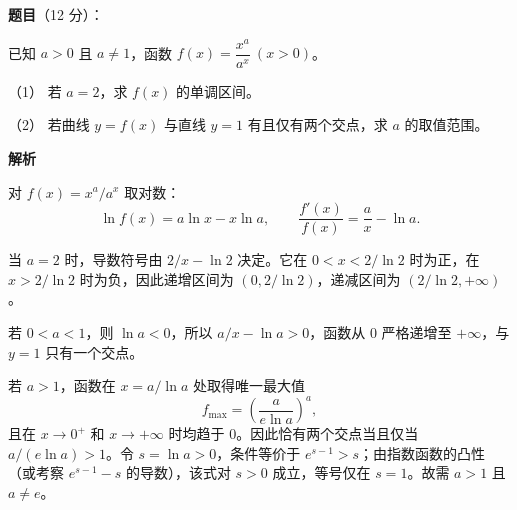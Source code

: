 \begin{answer}

\textbf{题目}（12 分）：

已知 $a>0$ 且 $a\ne1$，函数 $f(x)=\dfrac{x^a}{a^x}\ (x>0)$。

（1） 若 $a=2$，求 $f(x)$ 的单调区间。

（2） 若曲线 $y=f(x)$ 与直线 $y=1$ 有且仅有两个交点，求 $a$ 的取值范围。

\textbf{解析}

对 $f(x)=x^a/a^x$ 取对数：
\nopagebreak[4]
\[
\ln f(x)=a\ln x-x\ln a,\qquad
\frac{f'(x)}{f(x)}=\frac ax-\ln a.
\]


当 $a=2$ 时，导数符号由 $2/x-\ln2$ 决定。它在 $0<x<2/\ln2$ 时为正，在 $x>2/\ln2$ 时为负，因此递增区间为 $(0,2/\ln2)$，递减区间为 $(2/\ln2,+\infty)$。


若 $0<a<1$，则 $\ln a<0$，所以 $a/x-\ln a>0$，函数从 $0$ 严格递增至 $+\infty$，与 $y=1$ 只有一个交点。

若 $a>1$，函数在 $x=a/\ln a$ 处取得唯一最大值
\nopagebreak[4]
\[
f_{\max}=\left(\frac{a}{e\ln a}\right)^a,
\]
且在 $x\to0^+$ 和 $x\to+\infty$ 时均趋于 $0$。因此恰有两个交点当且仅当 $a/(e\ln a)>1$。令 $s=\ln a>0$，条件等价于 $e^{s-1}>s$；由指数函数的凸性（或考察 $e^{s-1}-s$ 的导数），该式对 $s>0$ 成立，等号仅在 $s=1$。故需 $a>1$ 且 $a\ne e$。



\end{answer}
